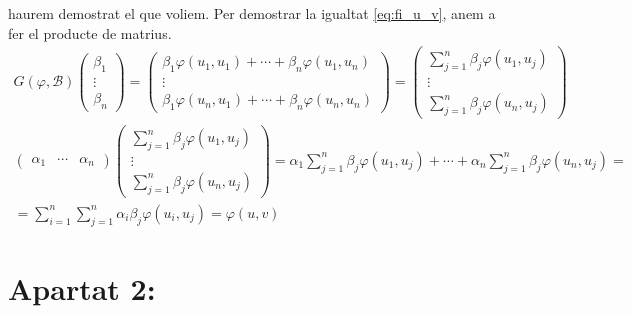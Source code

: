 \documentclass[a4paper, 12pt]{article}
\newcommand{\B}{\mathcal{B}}
\newcommand{\f}{\varphi}
\begin{document}
    haurem demostrat el que voliem. Per demostrar la igualtat \eqref{eq:fi_u_v}, anem a fer el producte de matrius.
    \begin{align*}
        G(\f,\B)
        \begin{pmatrix}
            \beta_1\\
            \vdots\\
            \beta_n
        \end{pmatrix}
        =
        \begin{pmatrix}
            \beta_1\f(u_1,u_1) + \cdots + \beta_n\f(u_1,u_n)\\
            \vdots\\
            \beta_1\f(u_n,u_1) + \cdots + \beta_n\f(u_n,u_n)
        \end{pmatrix}
        =
        \begin{pmatrix}
            \sum_{j=1}^n\beta_j\f(u_1,u_j)\\
            \vdots\\
            \sum_{j=1}^n\beta_j\f(u_n,u_j)
        \end{pmatrix}
    \end{align*}
    \begin{align*}
        \begin{pmatrix}
            \alpha_1 & \cdots & \alpha_n
        \end{pmatrix}
        \begin{pmatrix}
            \sum_{j=1}^n\beta_j\f(u_1,u_j)\\
            \vdots\\
            \sum_{j=1}^n\beta_j\f(u_n,u_j)
        \end{pmatrix}
        = \alpha_1 \sum_{j=1}^n\beta_j\f(u_1,u_j) + \cdots + \alpha_n \sum_{j=1}^n\beta_j\f(u_n,u_j) =\\
        = \sum_{i=1}^n\sum_{j=1}^n \alpha_i\beta_j\f(u_i,u_j) = \f(u,v)
    \end{align*}

    \section*{Apartat 2:}
\end{document}
